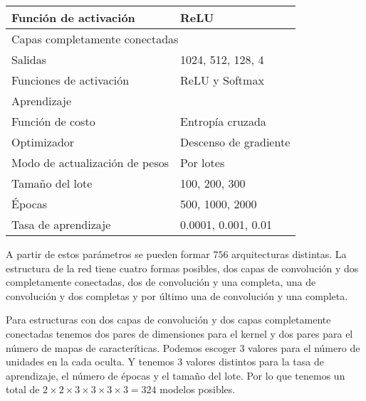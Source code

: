 \begin{table}[]
\begin{tabular}{|l|l|}
Función de activación    & ReLU                                                                                                                                        \\ \hline
\multicolumn{2}{|l|}{Capas completamente conectadas}                                                                                                                   \\ \hline
Salidas                  & 1024, 512, 128, 4                                                                                                                               \\ \hline
Funciones de activación  & ReLU y Softmax                                                                                                                              \\ \hline
\multicolumn{2}{|l|}{Aprendizaje}                                                                                                                                      \\ \hline
Función de costo         & Entropía cruzada                                                                                                                            \\ \hline
Optimizador              & Descenso de gradiente                                                                                                                       \\ \hline
Modo de actualización de pesos & Por lotes
\\ \hline
Tamaño del lote & 100, 200, 300
\\ \hline
Épocas & 500, 1000, 2000
\\ \hline
Tasa de aprendizaje & 0.0001, 0.001, 0.01
\\ \hline
\end{tabular}

\end{table}

A partir de estos parámetros se pueden formar $756$ arquitecturas distintas. 
La estructura de la red tiene cuatro formas posibles, dos capas de convolución
y dos completamente conectadas, dos de convolución y una completa, una de convolución
y dos completas y por último una de convolución y una completa. 

Para estructuras con dos capas de convolución y dos capas completamente conectadas 
tenemos dos
pares de dimensiones para el kernel y dos pares para el número de mapas de 
caracteríticas. Podemos escoger $3$ valores para el número de unidades 
en la cada oculta. Y tenemos $3$ valores distintos para la tasa de aprendizaje, 
el número de épocas y el tamaño del lote. Por lo que tenemos un total
de $2 \times 2 \times 3 \times 3 \times 3 \times 3 = 324$ modelos posibles. 

